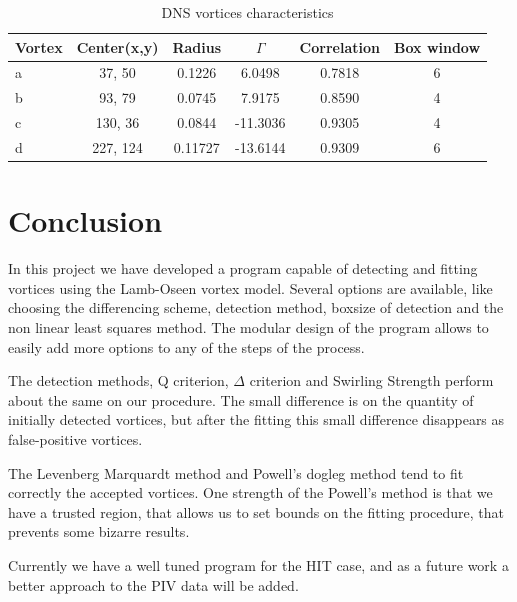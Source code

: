 \documentclass[12pt, a4paper, openany]{memoir}
\begin{document}
\begin{table}[h!]
	\centering
	\caption{DNS vortices characteristics}
	\vspace{10px}
	\label{tb:DNSvortices}
	\begin{tabular}{l|c|c|c|c|c}
		Vortex         & Center(x,y) & Radius    & $\Gamma$   & Correlation & Box window \\
		\hline
		a    & 37, 50   & 0.1226  & 6.0498   & 0.7818 & 6 \\
		b    & 93, 79   & 0.0745  & 7.9175   & 0.8590 & 4 \\
		c    & 130, 36  & 0.0844  & -11.3036 & 0.9305 & 4\\
		d    & 227, 124 & 0.11727 & -13.6144 & 0.9309 & 6
	\end{tabular}
\end{table}

\chapter{Conclusion}

In this project we have developed a program capable of detecting and fitting vortices using the Lamb-Oseen vortex model. Several options are available, like choosing the differencing scheme, detection method, boxsize of detection and the non linear least squares method. The modular design of the program allows to easily add more options to any of the steps of the process.

The detection methods, Q criterion, $\Delta$ criterion and Swirling Strength perform about the same on our procedure. The small difference is on the quantity of initially detected vortices, but after the fitting this small difference disappears as false-positive vortices.

The Levenberg Marquardt method and Powell's dogleg method tend to fit correctly the accepted vortices. One strength of the Powell's method is that we have a trusted region, that allows us to set bounds on the fitting procedure, that prevents some bizarre results.

Currently we have a well tuned program for the HIT case, and as a future work a better approach to the PIV data will be added.   


\end{document}
